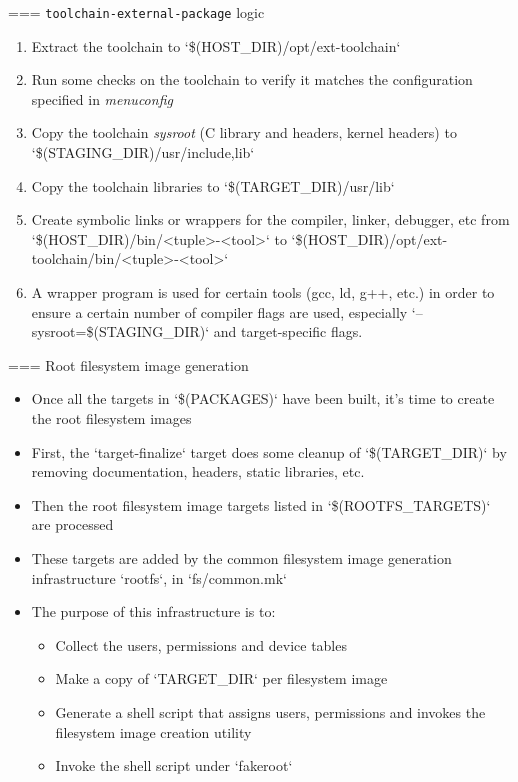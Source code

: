 === {{\tt toolchain-external-package} logic}
  \begin{enumerate}
  \item Extract the toolchain to `\$(HOST_DIR)/opt/ext-toolchain`
  \item Run some checks on the toolchain to verify it matches the
    configuration specified in {\em menuconfig}
  \item Copy the toolchain {\em sysroot} (C library and headers,
    kernel headers) to `\$(STAGING_DIR)/usr/{include,lib`}
  \item Copy the toolchain libraries to `\$(TARGET_DIR)/usr/lib`
  \item Create symbolic links or wrappers for the compiler, linker,
    debugger, etc from `\$(HOST_DIR)/bin/<tuple>-<tool>` to
    `\$(HOST_DIR)/opt/ext-toolchain/bin/<tuple>-<tool>`
  \item A wrapper program is used for certain tools (gcc, ld, g++,
    etc.) in order to ensure a certain number of compiler flags are
    used, especially `--sysroot=\$(STAGING_DIR)` and
    target-specific flags.
  \end{enumerate}


=== {Root filesystem image generation}
  \begin{itemize}
  \item Once all the targets in `\$(PACKAGES)` have been built,
    it's time to create the root filesystem images
  \item First, the `target-finalize` target does some cleanup of
    `\$(TARGET_DIR)` by removing documentation, headers, static
    libraries, etc.
  \item Then the root filesystem image targets listed in
    `\$(ROOTFS_TARGETS)` are processed
  \item These targets are added by the common filesystem image
    generation infrastructure `rootfs`, in `fs/common.mk`
  \item The purpose of this infrastructure is to:
    \begin{itemize}
    \item Collect the users, permissions and device tables
    \item Make a copy of `TARGET_DIR` per filesystem image
    \item Generate a shell script that assigns users, permissions and
      invokes the filesystem image creation utility
    \item Invoke the shell script under `fakeroot`
    \end{itemize}
  \end{itemize}


